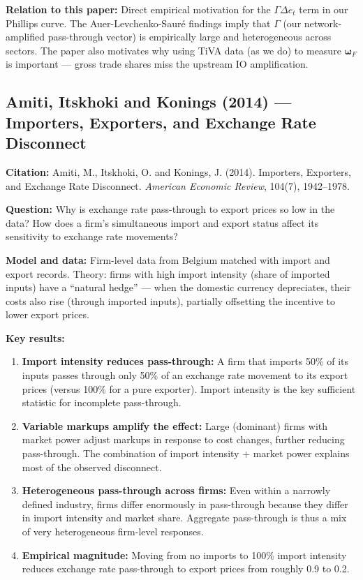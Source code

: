 \documentclass[12pt]{article}
\begin{document}
\textbf{Relation to this paper:} Direct empirical motivation for the $\Gamma\Delta e_t$ term in our Phillips curve. The Auer-Levchenko-Sauré findings imply that $\Gamma$ (our network-amplified pass-through vector) is empirically large and heterogeneous across sectors. The paper also motivates why using TiVA data (as we do) to measure $\bm{\omega}_F$ is important --- gross trade shares miss the upstream IO amplification.

\subsection{Amiti, Itskhoki and Konings (2014) --- Importers, Exporters, and Exchange Rate Disconnect}

\textbf{Citation:} Amiti, M., Itskhoki, O. and Konings, J. (2014). Importers, Exporters, and Exchange Rate Disconnect. \textit{American Economic Review}, 104(7), 1942--1978.

\textbf{Question:} Why is exchange rate pass-through to export prices so low in the data? How does a firm's simultaneous import and export status affect its sensitivity to exchange rate movements?

\textbf{Model and data:} Firm-level data from Belgium matched with import and export records. Theory: firms with high import intensity (share of imported inputs) have a ``natural hedge'' --- when the domestic currency depreciates, their costs also rise (through imported inputs), partially offsetting the incentive to lower export prices.

\textbf{Key results:}
\begin{enumerate}
    \item \textbf{Import intensity reduces pass-through:} A firm that imports 50\% of its inputs passes through only 50\% of an exchange rate movement to its export prices (versus 100\% for a pure exporter). Import intensity is the key sufficient statistic for incomplete pass-through.
    \item \textbf{Variable markups amplify the effect:} Large (dominant) firms with market power adjust markups in response to cost changes, further reducing pass-through. The combination of import intensity + market power explains most of the observed disconnect.
    \item \textbf{Heterogeneous pass-through across firms:} Even within a narrowly defined industry, firms differ enormously in pass-through because they differ in import intensity and market share. Aggregate pass-through is thus a mix of very heterogeneous firm-level responses.
    \item \textbf{Empirical magnitude:} Moving from no imports to 100\% import intensity reduces exchange rate pass-through to export prices from roughly 0.9 to 0.2.
\end{enumerate}
\end{document}
